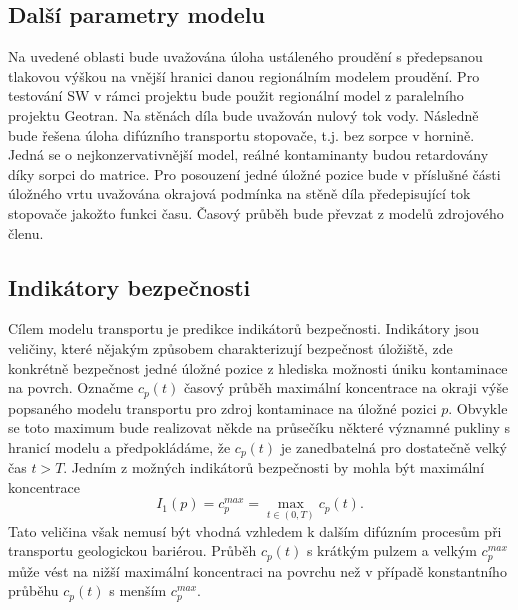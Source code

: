\documentclass{article}
\begin{document}
\subsection{Další parametry modelu}
Na uvedené oblasti bude uvažována úloha ustáleného proudění s předepsanou tlakovou výškou na vnější hranici danou regionálním modelem proudění. Pro testování SW v rámci projektu bude použit regionální model z paralelního projektu Geotran. Na stěnách díla bude uvažován nulový tok vody. 
Následně bude řešena úloha difúzního transportu stopovače, t.j. bez sorpce v hornině. Jedná se o nejkonzervativnější model, reálné kontaminanty budou retardovány díky sorpci do matrice. Pro posouzení jedné úložné pozice bude v příslušné části úložného vrtu uvažována okrajová podmínka na stěně díla předepisující tok stopovače jakožto funkci času. Časový průběh bude převzat z modelů zdrojového členu.

%

\subsection{Indikátory bezpečnosti}
Cílem modelu transportu je predikce indikátorů bezpečnosti. Indikátory jsou veličiny, které nějakým způsobem charakterizují bezpečnost úložiště, zde konkrétně bezpečnost jedné úložné pozice z hlediska možnosti úniku kontaminace na povrch. Označme $c_p(t)$ 
časový průběh maximální koncentrace na okraji výše popsaného modelu transportu pro zdroj kontaminace na úložné pozici $p$. Obvykle se toto maximum bude realizovat někde na průsečíku některé významné pukliny s hranicí modelu
a předpokládáme, že $c_p(t)$ je zanedbatelná pro dostatečně velký čas $t>T$.
Jedním z možných indikátorů bezpečnosti by mohla být maximální koncentrace
\begin{equation}
    I_1(p) = c_p^{max} = \max_{t\in(0, T)} c_p(t).
\end{equation}
Tato veličina však nemusí být vhodná vzhledem k dalším difúzním procesům při transportu geologickou bariérou.
Průběh $c_p(t)$ s krátkým pulzem a velkým $c_p^{max}$ může vést na nižší maximální koncentraci na povrchu než v případě konstantního průběhu $c_p(t)$ s menším  $c_p^{max}$.
\end{document}
